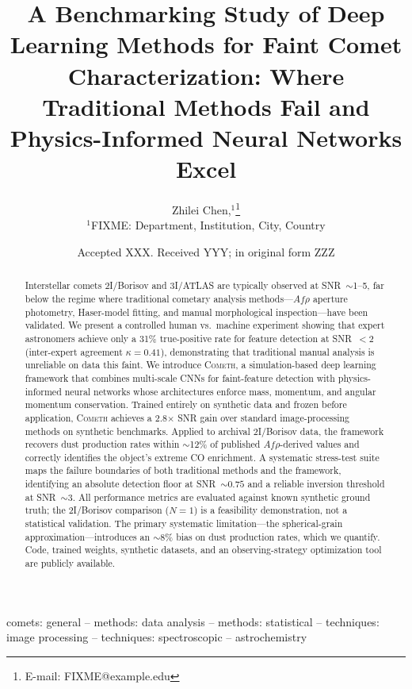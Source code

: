 \documentclass[usenatbib]{mnras}
\begin{document}
\title[A Deep Learning Framework for Faint Comet Characterization]{A Benchmarking Study of Deep Learning Methods for Faint Comet Characterization: Where Traditional Methods Fail and Physics-Informed Neural Networks Excel}

\author[Chen et al.]{
Zhilei Chen,$^{1}$\thanks{E-mail: FIXME@example.edu}
\\
$^{1}$FIXME: Department, Institution, City, Country
}

\date{Accepted XXX. Received YYY; in original form ZZZ}

\begin{abstract}
Interstellar comets 2I/Borisov and 3I/ATLAS are typically observed at SNR~$\sim$1--5, far below the regime where traditional cometary analysis methods---$Af\rho$ aperture photometry, Haser-model fitting, and manual morphological inspection---have been validated. We present a controlled human vs.\ machine experiment showing that expert astronomers achieve only a 31\% true-positive rate for feature detection at SNR~$<2$ (inter-expert agreement $\kappa = 0.41$), demonstrating that traditional manual analysis is unreliable on data this faint. We introduce \textsc{Cometh}, a simulation-based deep learning framework that combines multi-scale CNNs for faint-feature detection with physics-informed neural networks whose architectures enforce mass, momentum, and angular momentum conservation. Trained entirely on synthetic data and frozen before application, \textsc{Cometh} achieves a 2.8$\times$ SNR gain over standard image-processing methods on synthetic benchmarks. Applied to archival 2I/Borisov data, the framework recovers dust production rates within $\sim$12\% of published $Af\rho$-derived values and correctly identifies the object's extreme CO enrichment. A systematic stress-test suite maps the failure boundaries of both traditional methods and the framework, identifying an absolute detection floor at SNR~$\sim 0.75$ and a reliable inversion threshold at SNR~$\sim 3$. All performance metrics are evaluated against known synthetic ground truth; the 2I/Borisov comparison ($N=1$) is a feasibility demonstration, not a statistical validation. The primary systematic limitation---the spherical-grain approximation---introduces an $\sim$8\% bias on dust production rates, which we quantify. Code, trained weights, synthetic datasets, and an observing-strategy optimization tool are publicly available.
\end{abstract}

\begin{keywords}
comets: general -- methods: data analysis -- methods: statistical -- techniques: image processing -- techniques: spectroscopic -- astrochemistry
\end{keywords}
\end{document}
